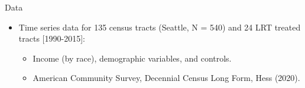 \documentclass[11pt,ignorenonframetext,]{beamer}
\providecommand{\tightlist}{%
  \setlength{\itemsep}{0pt}\setlength{\parskip}{0pt}}
\begin{document}
\begin{frame}{Data}
\protect\hypertarget{data}{}

\begin{itemize}
\tightlist
\item
  Time series data for 135 census tracts (Seattle, N = 540) and 24 LRT
  treated tracts {[}1990-2015{]}:

  \begin{itemize}
  \tightlist
  \item
    Income (by race), demographic variables, and controls.
  \item
    American Community Survey, Decennial Census Long Form, Hess (2020).
  \end{itemize}
\end{itemize}

\end{frame}
\end{document}
